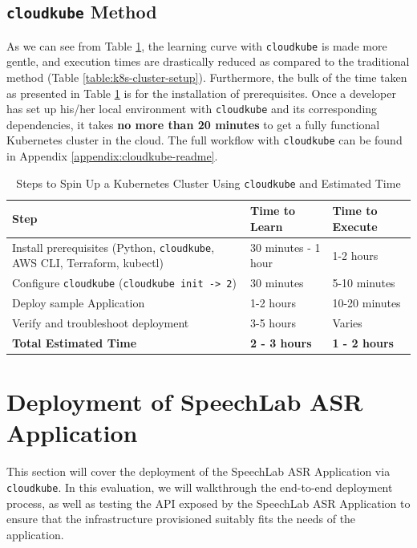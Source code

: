 \newpage
\subsection{\texttt{cloudkube} Method}

As we can see from Table \ref{table:k8s-cluster-cloudkube}, the learning curve with \texttt{cloudkube} is made more gentle, and execution times are drastically reduced as compared to the 
traditional method (Table \ref{table:k8s-cluster-setup}). Furthermore, the bulk of the time taken as presented in Table \ref{table:k8s-cluster-cloudkube} is for the installation of prerequisites.
Once a developer has set up his/her local environment with \texttt{cloudkube} and its corresponding dependencies, it takes \textbf{no more than 20 minutes} to get a fully
functional Kubernetes cluster in the cloud.  The full workflow with \texttt{cloudkube} can be found in Appendix \ref{appendix:cloudkube-readme}.
\begin{table}[h]
    \centering
    \renewcommand{\arraystretch}{1.3} %
    \begin{tabular}{|p{8cm}|p{3cm}|p{3cm}|}
        \hline
        \textbf{Step} & \textbf{Time to Learn} & \textbf{Time to Execute} \\
        \hline
        Install prerequisites (Python, \texttt{cloudkube}, AWS CLI, Terraform, kubectl) & 30 minutes - 1 hour & 1-2 hours \\
        \hline
        Configure \texttt{cloudkube} (\texttt{cloudkube init -> 2}) & 30 minutes & 5-10 minutes \\
        \hline
        Deploy sample Application & 1-2 hours & 10-20 minutes \\
        \hline
        Verify and troubleshoot deployment & 3-5 hours & Varies \\
        \hline
        \textbf{Total Estimated Time} & \textbf{2 - 3 hours} & \textbf{1 - 2 hours} \\
        \hline
    \end{tabular}
    \caption{Steps to Spin Up a Kubernetes Cluster Using \texttt{cloudkube} and Estimated Time}
    \label{table:k8s-cluster-cloudkube}
\end{table}

\section{Deployment of SpeechLab ASR Application}

This section will cover the deployment of the SpeechLab ASR Application via \texttt{cloudkube}. In this evaluation, we will walkthrough the end-to-end deployment process, as well as testing
the API exposed by the SpeechLab ASR Application to ensure that the infrastructure provisioned suitably fits the needs of the application.

